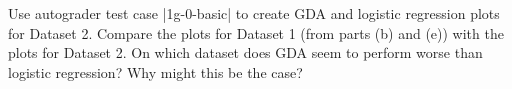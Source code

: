 \item {}
Use autograder test case |1g-0-basic| to create GDA and logistic regression plots for Dataset 2. Compare the plots for Dataset 1 (from parts (b) and (e)) with the plots for Dataset 2.  On which dataset does GDA seem to perform worse than logistic regression? Why might this be the case?
